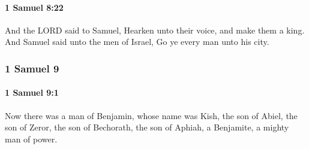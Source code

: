 		\paragraph{1 Samuel 8:22} %
			\label{1SAMUEL-8-22}

			And the LORD said to Samuel, Hearken unto their voice, and make them a king. And Samuel said unto the men of Israel, Go ye every man unto his city.

	\subsubsection{1 Samuel 9} %
		\label{1SAMUEL-9}

		\paragraph{1 Samuel 9:1} %
			\label{1SAMUEL-9-1}

			Now there was a man of Benjamin, whose name was Kish, the son of Abiel, the son of Zeror, the son of Bechorath, the son of Aphiah, a Benjamite, a mighty man of power.


